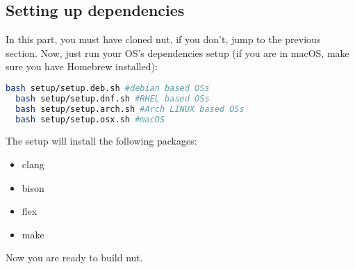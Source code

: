 \documentclass{article}
\begin{document}
  \subsection{Setting up dependencies}
  In this part, you must have cloned nut, if you don't, jump to the previous section. Now, just run your OS's dependencies setup (if you are in macOS, make sure you have Homebrew installed):
  \begin{lstlisting}[language=bash]
  bash setup/setup.deb.sh #debian based OSs
  bash setup/setup.dnf.sh #RHEL based OSs
  bash setup/setup.arch.sh #Arch LINUX based OSs
  bash setup/setup.osx.sh #macOS\end{lstlisting}
  The setup will install the following packages:
  \begin{itemize}
  	\item clang
  	\item bison
  	\item flex
  	\item make
  \end{itemize}
  Now you are ready to build nut.
\end{document}
